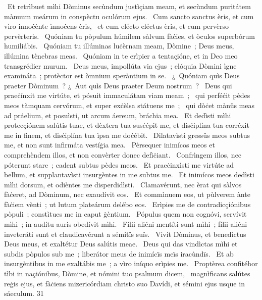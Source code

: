 {~Et retrìbuet mìhi Dòminus secùndum justìçiam meam, et secùndum puritátem mànuum meárum in conspèctu oculórum ejus.
~Cum sancto sanctus èris, et cum vìro innoċènte ìnnoċens èris,
~et cum elécto eléctus èris, et cum pervèrso pervèrteris.
~Quóniam tu pòpulum húmilem sàlvum fàċies, et òculos superbórum humiliábis.
~Quóniam tu illúminas luċèrnam meam, Dòmine~; Deus meus, illúmina tènebras meas.
~Quóniam in te erìpier a tentaçióne, et in Deo meo transgrédier murum.
~Deus meus, impollúta via ejus~; elóquia Dòmini ìgne examináta~; protèctor est òmnium speràntium in se.
~¿~Quóniam quìs Deus praeter Dòminum~? ¿~Aut quìs Deus praeter Deum nostrum~?
~Deus qui praeċínxit me virtúte, et pósuit immaculátam viam meam~;
~qui perféċit pèdes meos tàmquam cervórum, et super exċèlsa státuens me~;
~qui dòċet mànüs meas ad práelium, et posuìsti, ut arcum áereum, bráchia mea.
~Et dedìsti mìhi protecçiónem salútis tuae, et dèxtera tua susċépit me, et disċiplína tua corréxit me in finem, et disċiplína tua ìpsa me doċébit.
~Dilatavìsti gressüs meos subtus me, et non sunt infirmáta vestíġia mea.
~Pèrsequer inimícos meos et comprehèndem illos, et non convèrter donec defìċiant.
~Confrìngem illos, nec póterunt stare~; cadent subtus pèdes meos.
~Et praeċinxìsti me virtúte ad bellum, et supplantavìsti insurgèntes in me subtus me.
~Et inimícos meos dedìsti mìhi dorsum, et odièntes me disperdidìsti.
~Clamavérunt, nec èrat qui sàlvos fàċeret, ad Dòminum, nec exaudívit eos.
~Et commìnuem eos, ut pùlverem ànte fàċiem vènti~; ut lutum plateárum delébo eos.
~Erìpies me de contradicçiónibus pòpuli~; constìtues me in caput ġèntium.
~Pópulus quem non cognóvi, servívit mìhi~; in audítu auris obedívit mìhi.
~Fílii aliéni mentíti sunt mìhi~; fílii aliéni inveteráti sunt et claudicavérunt a sémitïs suïs.
~Vivit Dòminus, et benedìctus Deus meus, et exaltétur Deus salútis meae.
~Deus qui das vindìctas mìhi et subdis pòpulos sub me~; liberátor meus de inimícïs meïs iracùndïs.
~Et ab insurgèntibus in me exaltábis me~; a vìro iníquo erìpies me.
~Proptèrea confitébor tìbi in naçiónibus, Dòmine, et nómini tuo psalmum dicem,
~magnìficans salútes reġis ejus, et fàċiens mizericórdiam christo suo Davídi, et sémini ejus usque in sáeculum.}
{3}{1}
